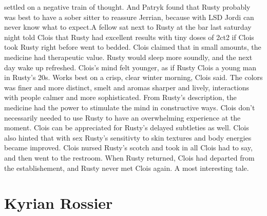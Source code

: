 \documentclass[12pt]{book}
\begin{document}
settled on a negative train of thought. And Patryk found that Rusty probably was best to have a sober sitter to reassure Jerrian, because with LSD Jordi can never know what to expect.A fellow sat next to Rusty at the bar last saturday night told Clois that Rusty had excellent results with tiny doses of 2ct2 if Clois took Rusty right before went to bedded. Clois claimed that in small amounts, the medicine had therapeutic value. Rusty would sleep more soundly, and the next day wake up refreshed. Clois's mind felt younger, as if Rusty Clois a young man in Rusty's 20s. Works best on a crisp, clear winter morning, Clois said. The colors was finer and more distinct, smelt and aromas sharper and lively, interactions with people calmer and more sophisticated. From Rusty's description, the medicine had the power to stimulate the mind in constructive ways. Clois don't necessarily needed to use Rusty to have an overwhelming experience at the moment. Clois can be appreciated for Rusty's delayed subtleties as well. Clois also hinted that with sex Rusty's sensitivty to skin textures and body energies became improved. Clois nursed Rusty's scotch and took in all Clois had to say, and then went to the restroom. When Rusty returned, Clois had departed from the establishement, and Rusty never met Clois again. A most interesting tale.



\chapter{Kyrian Rossier}
\end{document}
